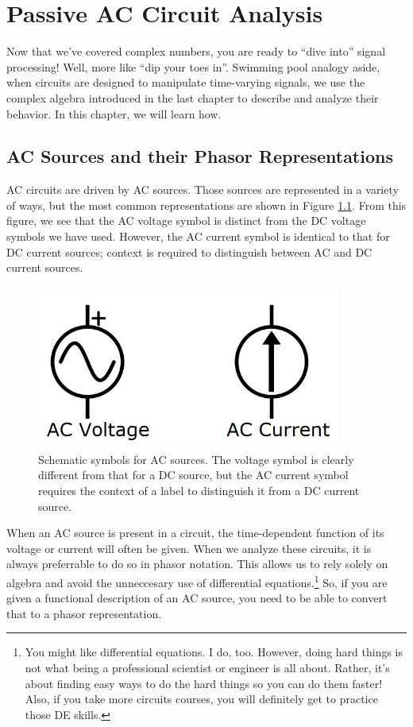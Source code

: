 \chapter{Passive AC Circuit Analysis}
\label{chap:ACcircuits}
Now that we've covered complex numbers, you are ready to ``dive into'' signal processing! Well, more like ``dip your toes in''. Swimming pool analogy aside, when circuits are designed to manipulate time-varying signals, we use the complex algebra introduced in the last chapter to describe and analyze their behavior. In this chapter, we will learn how.
\section{AC Sources and their Phasor Representations}
AC circuits are driven by AC sources. Those sources are represented in a variety of ways, but the most common representations are shown in Figure \ref{ACsources}. From this figure, we see that the AC voltage symbol is distinct from the DC voltage symbols we have used. However, the AC current symbol is identical to that for DC current sources; context is required to distinguish between AC and DC current sources. 
\begin{figure}[h!]
\centering
\includegraphics[width=10cm]{figures/ACsources.png}
\caption{Schematic symbols for AC sources. The voltage symbol is clearly different from that for a DC source, but the AC current symbol requires the context of a label to distinguish it from a DC current source.}
\label{ACsources}
\end{figure}
\par
When an AC source is present in a circuit, the time-dependent function of its voltage or current will often be given. When we analyze these circuits, it is always preferrable to do so in phasor notation. This allows us to rely solely on algebra and avoid the unneccesary use of differential equations.\footnote{You might like differential equations. I do, too. However, doing hard things is not what being a professional scientist or engineer is all about. Rather, it's about finding easy ways to do the hard things so you can do them faster! Also, if you take more circuits courses, you will definitely get to practice those DE skills.} So, if you are given a functional description of an AC source, you need to be able to convert that to a phasor representation.
